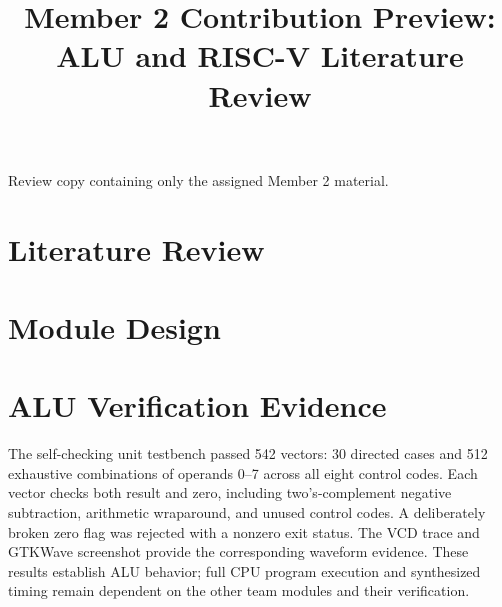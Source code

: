 \documentclass[conference]{IEEEtran}
\begin{document}
\title{Member 2 Contribution Preview: ALU and RISC-V Literature Review}
\author{}
\maketitle
\begin{center}
\footnotesize Review copy containing only the assigned Member 2 material.
\end{center}
\section{Literature Review}

\section{Module Design}

\section{ALU Verification Evidence}
The self-checking unit testbench passed 542 vectors: 30 directed cases and
512 exhaustive combinations of operands 0--7 across all eight control
codes. Each vector checks both result and zero, including two's-complement
negative subtraction, arithmetic wraparound, and unused control codes.
A deliberately broken zero flag was rejected with a nonzero exit status.
The VCD trace and GTKWave screenshot provide the corresponding waveform
evidence. These results establish ALU behavior; full CPU program execution
and synthesized timing remain dependent on the other team modules and
their verification.


\end{document}
